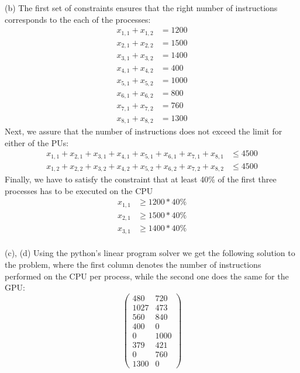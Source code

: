 \documentclass{article}
\begin{document}
(b) The first set of constraints ensures that the right number of instructions corresponds to the each of the processes:
\begin{equation*}
\begin{split}
    x_{1, 1} + x_{1, 2} &= 1200\\
    x_{2, 1} + x_{2, 2} &= 1500\\
    x_{3, 1} + x_{3, 2} &= 1400\\
    x_{4, 1} + x_{4, 2} &= 400\\
    x_{5, 1} + x_{5, 2} &= 1000\\
    x_{6, 1} + x_{6, 2} &= 800\\
    x_{7, 1} + x_{7, 2} &= 760\\
    x_{8, 1} + x_{8, 2} &= 1300
\end{split}
\end{equation*}
Next, we assure that the number of instructions does not exceed the limit for either of the PUs:
\begin{equation*}
\begin{split}
    x_{1, 1} + x_{2, 1} +x_{3, 1} + x_{4, 1} + x_{5, 1} +x_{6, 1} + x_{7, 1} +x_{8, 1} &\leq 4500 \\
    x_{1, 2} + x_{2, 2} +x_{3, 2} + x_{4, 2} + x_{5, 2} +x_{6, 2} + x_{7, 2} +x_{8, 2} &\leq 4500
\end{split}
\end{equation*}
Finally, we have to satisfy the constraint that at least 40\% of the first three processes has to be executed on the CPU
\begin{equation*}
\begin{split}
    x_{1, 1} &\geq 1200*40\%\\
    x_{2, 1} &\geq 1500*40\%\\
    x_{3, 1} &\geq 1400*40\%
\end{split}
\end{equation*} \\

(c), (d) Using the python's linear program solver we get the following solution to the problem, where the first column denotes the number of instructions performed on the CPU per process, while the second one does the same for the GPU:
\begin{equation*}
\begin{pmatrix}
    480 & 720 \\
    1027 & 473 \\
    560 & 840 \\
    400 & 0 \\
    0 & 1000 \\
    379 & 421\\ 
    0 & 760\\
    1300 & 0 
\end{pmatrix}
\end{equation*}\\
\end{document}
